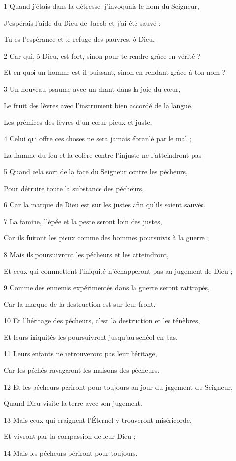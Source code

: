 \par 1 Quand j'étais dans la détresse, j'invoquais le nom du Seigneur,
\par     J'espérais l'aide du Dieu de Jacob et j'ai été sauvé ;
\par     Tu es l'espérance et le refuge des pauvres, ô Dieu.
\par 2 Car qui, ô Dieu, est fort, sinon pour te rendre grâce en vérité ?
\par     Et en quoi un homme est-il puissant, sinon en rendant grâce à ton nom ?
\par 3 Un nouveau psaume avec un chant dans la joie du cœur,
\par     Le fruit des lèvres avec l'instrument bien accordé de la langue,
\par     Les prémices des lèvres d'un cœur pieux et juste,
\par 4 Celui qui offre ces choses ne sera jamais ébranlé par le mal ;
\par     La flamme du feu et la colère contre l’injuste ne l’atteindront pas,
\par 5 Quand cela sort de la face du Seigneur contre les pécheurs,
\par     Pour détruire toute la substance des pécheurs,
\par 6 Car la marque de Dieu est sur les justes afin qu'ils soient sauvés.
\par   
\par 7 La famine, l'épée et la peste seront loin des justes,
\par     Car ils fuiront les pieux comme des hommes poursuivis à la guerre ;
\par 8 Mais ils poursuivront les pécheurs et les atteindront,
\par     Et ceux qui commettent l'iniquité n'échapperont pas au jugement de Dieu ;
\par 9 Comme des ennemis expérimentés dans la guerre seront rattrapés,
\par     Car la marque de la destruction est sur leur front.
\par 10 Et l'héritage des pécheurs, c'est la destruction et les ténèbres,
\par     Et leurs iniquités les poursuivront jusqu'au schéol en bas.
\par 11 Leurs enfants ne retrouveront pas leur héritage,
\par     Car les péchés ravageront les maisons des pécheurs.
\par 12 Et les pécheurs périront pour toujours au jour du jugement du Seigneur,
\par     Quand Dieu visite la terre avec son jugement.
\par 13 Mais ceux qui craignent l'Éternel y trouveront miséricorde,
\par     Et vivront par la compassion de leur Dieu ;
\par 14 Mais les pécheurs périront pour toujours.



